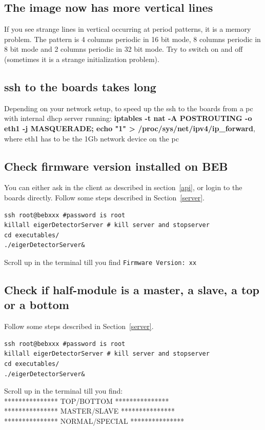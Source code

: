 \documentclass{article}
\begin{document}
\subsection{The image now has more vertical lines}

If you see strange lines in vertical occurring at period patterns, it is a memory problem. The pattern is 4 columns periodic in 16 bit mode, 8 columns periodic in 8 bit mode and 2 columns periodic in 32 bit mode. Try to switch on and off (sometimes it is a strange initialization problem).

\subsection{ssh to the boards takes long}
Depending on your network setup,  to speed up the ssh to the boards from a pc with internal dhcp server running: \textbf{iptables -t nat -A POSTROUTING -o eth1 -j MASQUERADE; echo "1" > /proc/sys/net/ipv4/ip\_forward}, where eth1 has to be the 1Gb network device on the pc

\subsection{Check firmware version installed on BEB}
You can either ask in the client as described in section~\ref{api}, or login to the boards directly. Follow some steps described in Section~\ref{server}. 
\begin{verbatim}
ssh root@bebxxx #password is root
killall eigerDetectorServer # kill server and stopserver
cd executables/
./eigerDetectorServer&
\end{verbatim}
Scroll up in the terminal till you find {\tt{Firmware Version: xx}}

\subsection{Check if half-module is a master, a slave, a top or a bottom}
Follow some steps described in Section~\ref{server}.
\begin{verbatim}
ssh root@bebxxx #password is root
killall eigerDetectorServer # kill server and stopserver
cd executables/
./eigerDetectorServer&
\end{verbatim}
Scroll up in the terminal till you find:\\
*************** TOP/BOTTOM ***************\\
*************** MASTER/SLAVE ***************\\
*************** NORMAL/SPECIAL ***************\\
\end{document}

